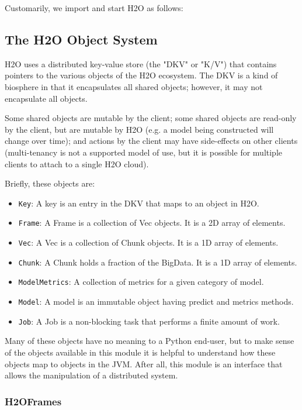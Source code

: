 Customarily, we import and start H2O as follows:


\subsection{The H2O Object System}

H2O uses a distributed key-value store (the "DKV" or "K/V") that contains pointers to the various objects of the H2O ecosystem. The DKV is a kind of biosphere in that it encapsulates all shared objects; however, it may not encapsulate all objects. 

Some shared objects are mutable by the client; some shared objects are read-only by the client, but are mutable by H2O (e.g. a model being constructed will change over time); and actions by the client may have side-effects on other clients (multi-tenancy is not a supported model of use, but it is possible for multiple clients to attach to a single H2O cloud).

Briefly, these objects are:

\begin{itemize}
\item \texttt{Key}: A key is an entry in the DKV that maps to an object in H2O.
\item \texttt{Frame}: A Frame is a collection of Vec objects. It is a 2D array of elements.
\item \texttt{Vec}: A Vec is a collection of Chunk objects. It is a 1D array of elements.
\item \texttt{Chunk}: A Chunk holds a fraction of the BigData. It is a 1D array of elements.
\item \texttt{ModelMetrics}: A collection of metrics for a given category of model.
\item \texttt{Model}: A model is an immutable object having predict and metrics methods.
\item \texttt{Job}: A Job is a non-blocking task that performs a finite amount of work.
\end{itemize}
Many of these objects have no meaning to a Python end-user, but to make sense of the objects available in this module it is helpful to understand how these objects map to objects in the JVM. After all, this module is an interface that allows the manipulation of a distributed system.


\subsubsection{H2OFrames}

